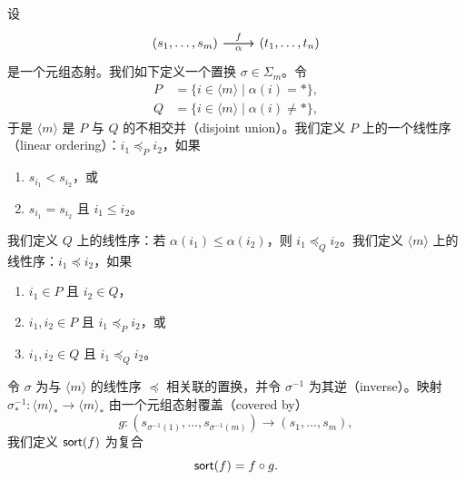 \begin{construction}\label{sortofmorphisminC}
    设
    \[ \begin{tikzcd}
    (s_1,\dots,s_m) \ar[r,"f"] \ar[r,swap,"\alpha"] &  (t_1,\dots,t_n)
    \end{tikzcd}\]
    是一个元组态射。我们如下定义一个置换 $\sigma \in \Sigma_m$。令
    \begin{align*} P & = \{i \in \langle m \rangle \mid \alpha(i) = *\},\\
Q & = \{ i \in \langle m \rangle \mid \alpha(i) \neq *\},
    \end{align*}
    于是 $\langle m \rangle$ 是 $P$ 与 $Q$ 的不相交并（disjoint union）。我们定义 $P$ 上的一个线性序（linear ordering）：$i_1 \preceq_P i_2$，如果
    \begin{enumerate}
    \item $s_{i_1} < s_{i_2}$，或
    \item $s_{i_1} = s_{i_2}$ 且 $i_1 \leq i_2$。
    \end{enumerate}
    我们定义 $Q$ 上的线性序：若 $\alpha(i_1) \leq \alpha(i_2)$，则 $i_1 \preceq_Q i_2$。我们定义 $\langle m \rangle$ 上的线性序：$i_1 \preceq i_2$，如果
    \begin{enumerate}
    \item $i_1 \in P$ 且 $i_2 \in Q$，
    \item $i_1,i_2 \in P$ 且 $i_1 \preceq_P i_2$，或
    \item $i_1,i_2 \in Q$ 且 $i_1 \preceq_Q i_2$。
    \end{enumerate}
    令 $\sigma$ 为与 $\langle m \rangle$ 的线性序 $\preceq$ 相关联的置换，并令 $\sigma^{-1}$ 为其逆（inverse）。映射 $\sigma^{-1}_*:\langle m \rangle_* \to \langle m \rangle_*$ 由一个元组态射覆盖（covered by）
    \[
    g: (s_{\sigma^{-1}(1)},\dots,s_{\sigma^{-1}(m)}) \to (s_1,\dots,s_m),
    \]
    我们定义 $\mathsf{sort}(f)$ 为复合
    \[
    \mathsf{sort}(f) = f \circ g.
    \]
\end{construction}

